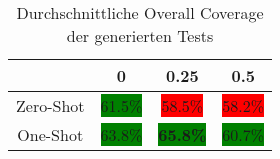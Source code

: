 \bgroup
\def\arraystretch{2}
\begin{table}[H]
	\vspace{.5cm}
	\centering		
	\begin{center}
		\begin{tabular}{|c||c|c|c|}
			\hline 
			& 0 & 0.25 & 0.5 \\
			\hline 
			\hline
			Zero-Shot & \colorbox{green}{61.5\%} & \colorbox{red}{58.5\%} & \colorbox{red}{58.2\%} \\
			\hline
			One-Shot & \colorbox{green}{63.8\%} & \colorbox{green}{\textbf{65.8\%}} & \colorbox{green}{60.7\%} \\
			\hline
		\end{tabular} 
	\end{center}
	\caption{Durchschnittliche Overall Coverage der generierten Tests}
	\label{fig:o-avg}
	\vspace{-.8cm}
\end{table}
\egroup
